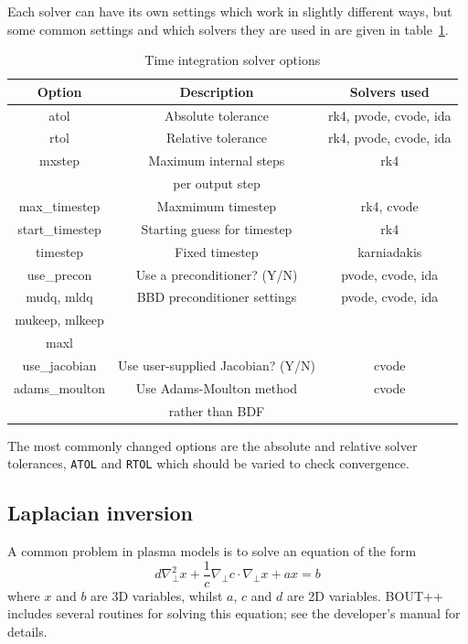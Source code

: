 \documentclass[12pt]{article}
\newcommand{\code}[1]{\texttt{#1}}
\begin{document}
Each solver can have its own settings which work in slightly different ways, but some common
settings and which solvers they are used in are given in table~\ref{tab:solveropts}.
\begin{table}[htb!]
\centering
\caption{Time integration solver options}
\label{tab:solveropts}
\begin{tabular}{c | c | c}
\hline
Option & Description & Solvers used \\
\hline
atol & Absolute tolerance & rk4, pvode, cvode, ida \\
rtol & Relative tolerance & rk4, pvode, cvode, ida \\
mxstep & Maximum internal steps  & rk4 \\
       & per output step & \\
max\_timestep & Maxmimum timestep & rk4, cvode \\
start\_timestep & Starting guess for timestep & rk4 \\
timestep & Fixed timestep & karniadakis \\
use\_precon & Use a preconditioner? (Y/N) & pvode, cvode, ida \\
mudq, mldq & BBD preconditioner settings & pvode, cvode, ida \\
mukeep, mlkeep & & \\
maxl & & \\
use\_jacobian & Use user-supplied Jacobian? (Y/N) & cvode \\
adams\_moulton & Use Adams-Moulton method & cvode \\
 & rather than BDF & \\
\hline
\end{tabular}
\end{table}
The most commonly changed options are the  absolute and relative solver tolerances,
\code{ATOL} and \code{RTOL} which should be varied to check convergence.

\subsection{Laplacian inversion}
A common problem in plasma models is to solve an equation of the form
\[
d\nabla^2_\perp x + \frac{1}{c}\nabla_\perp c\cdot\nabla_\perp x + a x = b
\]
where $x$ and $b$ are 3D variables, whilst $a$, $c$ and $d$ are 2D variables.
BOUT++ includes several routines for solving this equation; see the
developer's manual for details.
\end{document}
